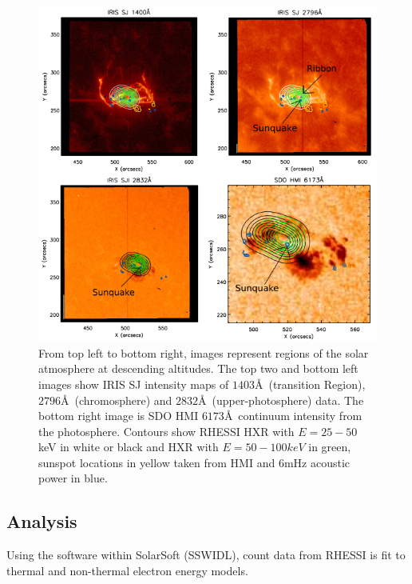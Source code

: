 \begin{figure}[H]
  \begin{center}
  \includegraphics[width=1.0\textwidth]{saxcontours-square}
  \end{center}
  \caption{From top left to bottom right, images represent regions of the solar atmosphere at descending altitudes. The top two and bottom left images show IRIS SJ intensity maps of $1403$\AA\ (transition Region), $2796$\AA\ (chromosphere) and $2832$\AA\ (upper-photosphere) data. The bottom right image is SDO HMI $6173$\AA\ continuum intensity from the photosphere. Contours show RHESSI HXR with $E = 25-50$ keV in white or black and HXR with $E = 50-100 keV$ in green, sunspot locations in yellow taken from HMI and 6mHz acoustic power in blue.}\label{saxcontours-vert}
\end{figure}


\subsection{Analysis}


Using the  software within SolarSoft (SSWIDL), count data from RHESSI is fit to thermal and non-thermal electron energy models. %

